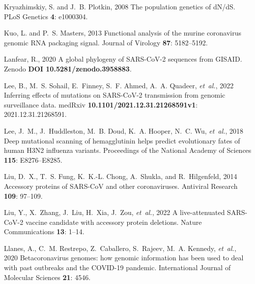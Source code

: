 \documentclass[9pt,twocolumn,twoside]{gsajnl_modified}
\begin{document}
{\begin{thebibliography}{76}
{Kryazhimskiy, S. {\rm and} J.~B. Plotkin}, 2008 The population genetics of
  {dN/dS}. PLoS Genetics {\bf 4}: e1000304.

{Kuo, L. {\rm and} P.~S. Masters}, 2013 Functional analysis of the murine
  coronavirus genomic {RNA} packaging signal. Journal of Virology {\bf 87}:
  5182--5192.

{Lanfear, R.}, 2020 {A global phylogeny of SARS-CoV-2 sequences from GISAID}.
  Zenodo {\bf DOI 10.5281/zenodo.3958883}.

{Lee, B., M.~S. Sohail, E.~Finney, S.~F. Ahmed, A.~A. Quadeer, {\em et~al.\/}},
  2022 Inferring effects of mutations on {SARS}-{CoV}-2 transmission from
  genomic surveillance data. medRxiv {\bf 10.1101/2021.12.31.21268591v1}:
  2021.12.31.21268591.

{Lee, J.~M., J.~Huddleston, M.~B. Doud, K.~A. Hooper, N.~C. Wu, {\em
  et~al.\/}}, 2018 Deep mutational scanning of hemagglutinin helps predict
  evolutionary fates of human {H3N2} influenza variants. Proceedings of the
  National Academy of Sciences {\bf 115}: E8276--E8285.

{Liu, D.~X., T.~S. Fung, K.~K.-L. Chong, A.~Shukla, {\rm and} R.~Hilgenfeld},
  2014 Accessory proteins of {SARS-CoV} and other coronaviruses. Antiviral
  Research {\bf 109}: 97--109.

{Liu, Y., X.~Zhang, J.~Liu, H.~Xia, J.~Zou, {\em et~al.\/}}, 2022 A
  live-attenuated {SARS-CoV-2} vaccine candidate with accessory protein
  deletions. Nature Communications {\bf 13}: 1--14.

{Llanes, A., C.~M. Restrepo, Z.~Caballero, S.~Rajeev, M.~A. Kennedy, {\em
  et~al.\/}}, 2020 Betacoronavirus genomes: how genomic information has been
  used to deal with past outbreaks and the {COVID-19} pandemic. International
  Journal of Molecular Sciences {\bf 21}: 4546.


\end{thebibliography}}
\end{document}
